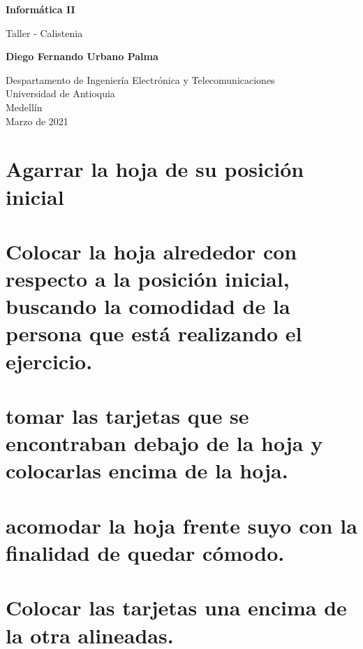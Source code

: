 \documentclass{article}
\begin{document}
\begin{titlepage}
    \begin{center}
        \vspace*{1cm}
            
        \Huge
        \textbf{Informática II}
            
        \vspace{0.5cm}
        \LARGE
        Taller - Calistenia 
            
        \vspace{1.5cm}
            
        \textbf{Diego Fernando Urbano Palma}
            
        \vfill
            
        \vspace{0.8cm}
            
        \Large
        Despartamento de Ingeniería Electrónica y Telecomunicaciones\\
        Universidad de Antioquia\\
        Medellín\\
        Marzo de 2021
            
    \end{center}
\end{titlepage}


\section{ Agarrar la hoja de su posición inicial }\label{intro}

\section{Colocar la hoja alrededor con respecto a la posición inicial, buscando la comodidad de la persona que está realizando el ejercicio.}

\section{tomar las tarjetas que se encontraban debajo de la hoja y colocarlas encima de la hoja.}

\section{acomodar la hoja frente suyo con la finalidad de quedar cómodo.}

\section{Colocar las tarjetas una encima de la otra alineadas.}
\end{document}
